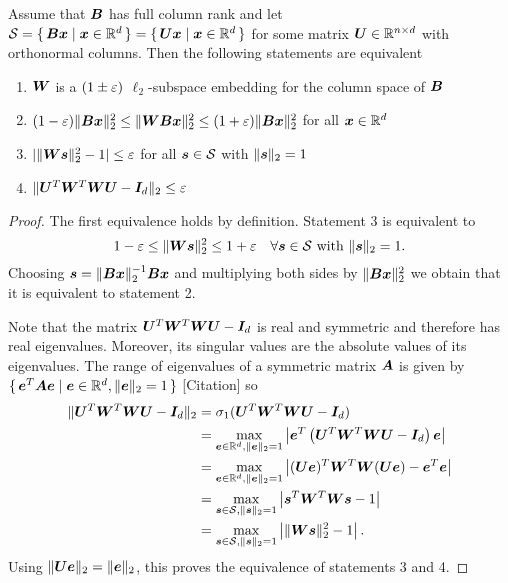 \begin{theorem}
Assume that \(\bm{B}\) has full column rank and let \(\mathcal{S} = \set{ \bm{B}\bm{x} | \bm{x} \in \mathbb{R}^d } = \set{ \bm{U}\bm{x} | \bm{x} \in \mathbb{R}^d }\) for some matrix \(\bm{U} \in \mathbb{R}^{n \times d}\) with orthonormal columns.
Then the following statements are equivalent
\begin{enumerate}
  \item \(\bm{W}\) is a \((1\pm\varepsilon)\) \(\ell_2\)-subspace embedding for the column space of \(\bm{B}\)
  \item \((1-\varepsilon) \lVert \bm{B}\bm{x} \rVert_2^2 \leq \lVert \bm{W}\bm{B}\bm{x} \rVert_2^2 \leq (1+\varepsilon)\lVert \bm{B}\bm{x} \rVert_2^2\) for all \(\bm{x} \in \mathbb{R}^d\)
  \item \(\lvert \lVert \bm{W}\bm{s} \rVert_2^2 - 1 \rvert \leq \varepsilon\) for all \(\bm{s} \in \mathcal{S}\) with \(\lVert \bm{s} \rVert_2 = 1\)
  \item \(\lVert \bm{U}^T \bm{W}^T \bm{W} \bm{U} - \bm{I}_d \rVert_2 \leq \varepsilon\)
\end{enumerate}
\end{theorem}
\begin{proof}
The first equivalence holds by definition. Statement 3 is equivalent to
\[ 1-\varepsilon \leq \lVert \bm{W}\bm{s} \rVert_2^2 \leq 1+\varepsilon \quad \forall \bm{s} \in \mathcal{S} \text{ with } \lVert \bm{s} \rVert_2 = 1. \]
Choosing \(\bm{s} = \lVert \bm{B}\bm{x} \rVert_2^{-1} \bm{B}\bm{x}\) and multiplying both sides by \(\lVert \bm{B}\bm{x} \rVert_2^2\) we obtain that it is equivalent to statement 2.


Note that the matrix \(\bm{U}^T \bm{W}^T \bm{W} \bm{U} - \bm{I}_d\) is real and symmetric and therefore has real eigenvalues.
Moreover, its singular values are the absolute values of its eigenvalues.
The range of eigenvalues of a symmetric matrix \(\bm{A}\) is given by \(\set{ \bm{e}^T \bm{A} \bm{e} | \bm{e} \in \mathbb{R}^d, \lVert \bm{e} \rVert_2 = 1 }\) [Citation] so
\begin{align*}
  \lVert \bm{U}^T \bm{W}^T \bm{W} \bm{U} - \bm{I}_d \rVert_2
  &= \sigma_1(\bm{U}^T \bm{W}^T \bm{W} \bm{U} - \bm{I}_d) \\
  &= \max_{\bm{e} \in \mathbb{R}^d, \lVert \bm{e} \rVert_2 = 1} \left\lvert \bm{e}^T \left( \bm{U}^T \bm{W}^T \bm{W} \bm{U} - \bm{I}_d \right) \bm{e}  \right\rvert \\
  &= \max_{\bm{e} \in \mathbb{R}^d, \lVert \bm{e} \rVert_2 = 1} \left\lvert (\bm{U}\bm{e})^T \bm{W}^T \bm{W} (\bm{U}\bm{e}) - \bm{e}^T \bm{e} \right\rvert \\
  &= \max_{\bm{s} \in \mathcal{S}, \lVert \bm{s} \rVert_2 = 1} \left\lvert \bm{s}^T \bm{W}^T \bm{W} \bm{s} - 1 \right\rvert \\
  &= \max_{\bm{s} \in \mathcal{S}, \lVert \bm{s} \rVert_2 = 1} \left\lvert \lVert \bm{W}\bm{s} \rVert_2^2 - 1 \right\rvert.
\end{align*}
Using \(\lVert \bm{U}\bm{e} \rVert_2 = \lVert \bm{e} \rVert_2\), this proves the equivalence of statements 3 and 4.
\end{proof}


